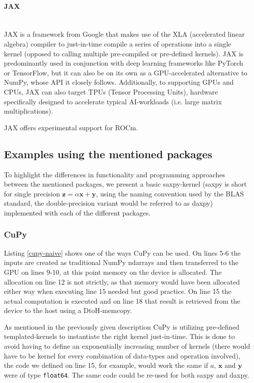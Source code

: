 \documentclass[english,11pt,a4paper,table]{article} %
\begin{document}
\paragraph*{JAX}\mbox{}\\

JAX \cite{jax2018github} is a framework from Google that makes use of the XLA \cite{XLAOptim3:online} (accelerated linear algebra) compiler to just-in-time compile a series of operations into a single kernel (opposed to calling multiple pre-compiled or pre-defined kernels).
JAX is predominantly used in conjunction with deep learning frameworks like PyTorch or TensorFlow, but it can also be on its own as a GPU-accelerated alternative to NumPy, whose API it closely follows.
Additionally, to supporting GPUs and CPUs, JAX can also target TPUs (Tensor Processing Units), hardware specifically designed to accelerate typical AI-workloads (i.e. large matrix multiplications).

JAX offers experimental support for ROCm.

\subsection{Examples using the mentioned packages}

To highlight the differences in functionality and programming approaches between the mentioned packages, we present a basic saxpy-kernel (saxpy is short for single precision $\mathbf{z} = \alpha \mathbf{x}+ \mathbf{y}$, using the naming convention used by the BLAS standard, the double-precision variant would be referred to as daxpy) implemented with each of the different packages.

\subsubsection{CuPy}

Listing \ref{cupy-naive} shows one of the ways CuPy can be used.
On lines 5-6 the inputs are created as traditional NumPy ndarrays and then transferred to the GPU on lines 9-10, at this point memory on the device is allocated.
The allocation on line 12 is not strictly, as that memory would have been allocated either way when executing line 15 needed but good practice.
On line 15 the actual computation is executed and on line 18 that result is retrieved from the device to the host using a DtoH-memcopy.

As mentioned in the previously given description CuPy is utilizing pre-defined templated-kernels to instantiate the right kernel just-in-time.
This is done to avoid having to define an exponentially increasing number of kernels (there would have to be kernel for every combination of data-types and operation involved), the code we defined on line 15, for example, would work the same if $a$, $\mathbf{x}$ and $\mathbf{y}$ were of type \texttt{float64}.
The same code could be re-used for both saxpy and daxpy.
\end{document}
